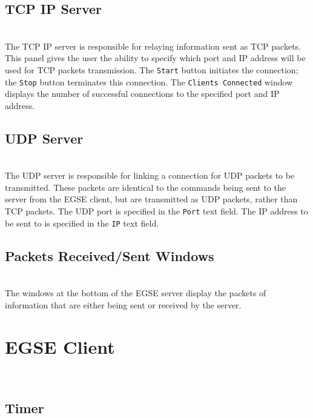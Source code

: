 \documentclass[11pt,titlepage]{article}
\begin{document}
	\subsection{TCP IP Server}
	\hrulefill
	\\
	The TCP IP server is responsible for relaying information sent as TCP packets. This panel gives the user the ability to specify which port and IP address will be used for TCP packets transmission. The \texttt{Start} button initiates the connection; the \texttt{Stop} button terminates this connection. The \texttt{Clients Connected} window displays the number of successful connections to the specified port and IP address.
	
	\subsection{UDP Server}
	\hrulefill
	\\
	The UDP server is responsible for linking a connection for UDP packets to be transmitted. These packets are identical to the commands being sent to the server from the EGSE client, but are transmitted as UDP packets, rather than TCP packets. The UDP port is specified in the \texttt{Port} text field. The IP address to be sent to is specified in the \texttt{IP} text field. \par
	
	
	\subsection{Packets Received/Sent Windows}
	\hrulefill
	\\
	The windows at the bottom of the EGSE server display the packets of information that are either being sent or received by the server.	

\newpage
\section{EGSE Client}
\hrulefill
\\

	\subsection{Timer}
	\hrulefill
	\\
	
\end{document}
